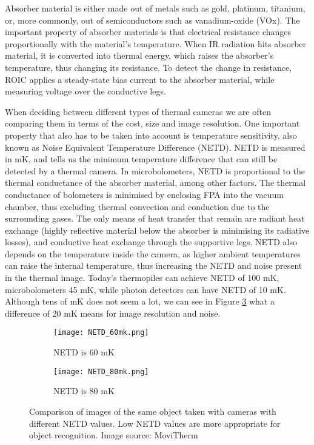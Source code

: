 Absorber material is either made out of metals such as gold, platinum, titanium, or, more commonly, out of semiconductors such as vanadium-oxide (VOx)\cite{thermal_article}.
The important property of absorber materials is that electrical resistance changes proportionally with the material's temperature\cite{thermal_book}.
When IR radiation hits absorber material, it is converted into thermal energy, which raises the absorber's temperature, thus changing its resistance.
To detect the change in resistance, ROIC applies a steady-state bias current to the absorber material, while measuring voltage over the conductive legs\cite{thermal_book}. 

When deciding between different types of thermal cameras we are often comparing them in terms of the cost, size and image resolution.
One important property that also has to be taken into account is temperature sensitivity, also known as Noise Equivalent Temperature Difference (NETD).
NETD is measured in \si{\milli\kelvin}, and tells us the minimum temperature difference that can still be detected by a thermal camera.
In microbolometers, NETD is proportional to the thermal conductance of the absorber material, among other factors\cite{thermal_book}.
The thermal conductance of bolometers is minimised by enclosing FPA into the vacuum chamber, thus excluding thermal convection and conduction due to the surrounding gases.
The only means of heat transfer that remain are radiant heat exchange (highly reflective material below the absorber is minimising its radiative losses), and conductive heat exchange through the supportive legs.
NETD also depends on the temperature inside the camera, as higher ambient temperatures can raise the internal temperature, thus increasing the NETD and noise present in the thermal image.
Today's thermopiles can achieve NETD of 100 \si{\milli\kelvin}, microbolometers 45 \si{\milli\kelvin}, while photon detectors can have NETD of 10 \si{\milli\kelvin}.
Although tens of \si{\milli\kelvin} does not seem a lot, we can see in Figure \ref{NETD} what a difference of 20 \si{\milli\kelvin} means for image resolution and noise.
\newline

\begin{figure}[ht]
    \begin{subfigure}{0.5\textwidth}
        \centering
        \texttt{[image: NETD\_60mk.png]} 
        \caption{NETD is 60 \si{\milli\kelvin}}
        \label{NETD_60mk}
    \end{subfigure}
    \begin{subfigure}{0.5\textwidth}
        \centering
        \texttt{[image: NETD\_80mk.png]}
        \caption{NETD is 80 \si{\milli\kelvin}}
        \label{NETD_80mk}
    \end{subfigure}
    \caption[Comparison of images of the same object taken with cameras with different NETD values.]{Comparison of images of the same object taken with cameras with different NETD values. Low NETD values are more appropriate for object recognition. Image source: MoviTherm \cite{NETD}}
    \label{NETD}
\end{figure}



